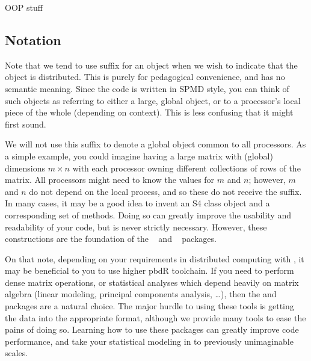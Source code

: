 OOP stuff

\subsection[Notation]{Notation}
\label{sec:notation}

Note that we tend to use suffix  for an object when we wish to indicate that the object is distributed.  This is purely for pedagogical convenience, and has no semantic meaning.  Since the code is written in SPMD style, you can think of such objects as referring to either a large, global object, or to a processor's local piece of the whole (depending on context).  This is less confusing that it might first sound.


We will not use this suffix to denote a global object common to all processors.  As a simple example, you could imagine having a large matrix with (global) dimensions $m\times n$ with each processor owning different collections of rows of the matrix.  All processors might need to know the values for $m$ and $n$; however, $m$ and $n$ do not depend on the local process, and so these do not receive the  suffix.  In many cases, it may be a good idea to invent an S4 class object and a corresponding set of methods.  Doing so can greatly improve the usability and readability of your code, but is never strictly necessary.  However, these constructions are the foundation of the ~\citep{Schmidt2012pbdBASEpackage} and
~\citep{Schmidt2012pbdDMATpackage} packages.

On that note, depending on your requirements in distributed computing with , it may be beneficial to you to use higher pbdR toolchain.  If you need to perform dense matrix operations, or statistical analyses which depend heavily on matrix algebra (linear modeling, principal components analysis, \dots), then the  and  packages are a natural choice.  The major hurdle to using these tools is getting the data into the appropriate  format, although we provide many tools to ease the pains of doing so.  Learning how to use these packages can greatly improve code performance, and take your statistical modeling in  to previously unimaginable scales.

